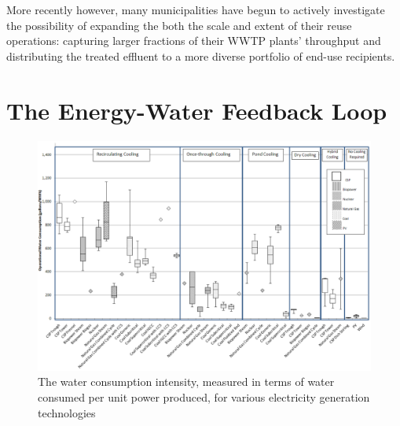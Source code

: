 More recently however, many municipalities have begun to actively investigate the possibility of expanding the both the scale and extent of their reuse operations: capturing larger fractions of their WWTP plants' throughput and distributing the treated effluent to a more diverse portfolio of end-use recipients.  
              
 \section{The Energy-Water Feedback Loop}
 
        \begin{figure}[!h]
       \centering
       \includegraphics[width=5.5in]{figures/water_consumption_for_energy.png}
       \caption[Water Intensity of Energy Production]{The water consumption intensity, measured in terms of water consumed per unit power produced, for various electricity generation technologies}
       \label{fig:water-consumption-intensity}
        \end{figure}

